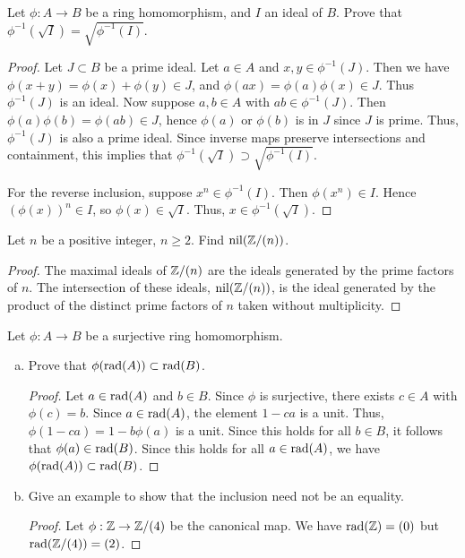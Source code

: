 \documentclass{article}
\begin{document}
 Let $\phi: A \to B$ be a ring homomorphism, and $I$ an ideal of $B$. Prove that $\phi^{-1}(\sqrt I) = \sqrt{\phi^{-1}(I)}$.

\begin{proof}
Let $J \subset B$ be a prime ideal.  Let $a \in A$ and $x,y \in \phi^{-1}(J)$.  Then we have $\phi(x + y) = \phi(x) + \phi(y) \in J$, and $\phi(ax) = \phi(a)\phi(x) \in J$.  Thus $\phi^{-1}(J)$ is an ideal.   Now suppose $a,b \in A$ with $ab \in \phi^{-1}(J)$.  Then $\phi(a)\phi(b) = \phi(ab) \in J$,  hence $\phi(a)$ or $\phi(b)$ is in $J$ since $J$ is prime.  Thus, $\phi^{-1}(J)$ is also a prime ideal.  Since inverse maps preserve intersections and containment, this implies that $\phi^{-1}(\sqrt I) \supset \sqrt{\phi^{-1}(I)}$.

For the reverse inclusion, suppose $x^n \in \phi^{-1}(I)$.  Then $\phi(x^n) \in I$.  Hence $(\phi(x))^n \in I$, so $\phi(x) \in \sqrt I$.  Thus, $x \in \phi^{-1}(\sqrt I)$.
\end{proof}

 Let $n$ be a positive integer, $n \ge 2$. Find $\operatorname{nil}(\mathbb{Z}/(n))$.
\begin{proof}
The maximal ideals of $\mathbb{Z}/(n)$ are the ideals generated by the prime factors of $n$.  The intersection of these ideals, $\operatorname{nil}(\mathbb{Z}/(n))$,  is the ideal generated by the product of the distinct prime factors of $n$ taken without multiplicity.
\end{proof}

 Let $\phi: A \to B$ be a surjective ring homomorphism.
\begin{enumerate}[(a)]
\item Prove that $\phi(\operatorname{rad}(A)) \subset \operatorname{rad}(B)$.
\begin{proof}
Let $a \in \operatorname{rad}(A)$ and $b \in B$.  Since $\phi$ is surjective, there exists $c \in A$ with $\phi(c) = b$.  Since $a \in \operatorname{rad}(A)$, the element $1 - ca$ is a unit. Thus, $\phi(1 - ca) = 1 - b\phi(a)$ is a unit.  Since this holds for all $b \in B$, it follows that $\phi(a) \in \operatorname{rad}(B)$.  Since this holds for all $a \in \operatorname{rad}(A)$, we have $\phi(\operatorname{rad}(A)) \subset \operatorname{rad}(B)$.
\end{proof}
\item Give an example to show that the inclusion need not be an equality.
\begin{proof}
Let $\phi:\mathbb{Z} \to \mathbb{Z}/(4)$ be the canonical map.  We have $\operatorname{rad}(\mathbb{Z}) = (0)$ but $\operatorname{rad}(\mathbb{Z}/(4)) = (2)$.
\end{proof}
\end{enumerate}
\end{document}
